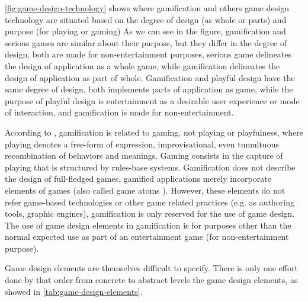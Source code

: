 \autoref{fig:game-design-technology} shows where gamification and others game design technology are situated based on the degree of design (as whole or parts) and purpose (for playing or gaming)
As we can see in the figure, gamification and serious games are similar about their purpose, but they differ in the degree of design, both are made for non-entertainment purposes, serious game delineates the design of application as a whole game, while gamification delineates the design of application as part of whole.
Gamification and playful design have the same degree of design, both implements parts of application as game, while the purpose of playful design is entertainment as a desirable user experience or mode of interaction, and gamification is made for non-entertainment.

According to , gamification is related to gaming, not playing or playfulness, where playing denotes a free-form of expression, improvisational, even tumultuous recombination of behaviors and meanings.
Gaming consists in the capture of playing that is structured by rules-base systems. Gamification does not describe the design of full-fledged games, gamified applications merely incorporate elements of games (also called game atoms \cite{BrathwaiteSchreiber2009}).
However, these elements do not refer game-based technologies or other game related practices (e.g. as authoring tools, graphic engines), gamification is only reserved for the use of game design.
The use of game design elements in gamification is for purposes other than the normal expected use as part of an entertainment game (for non-entertainment purpose).

Game design elements are themselves difficult to specify.
There is only one effort done by  that order from concrete to abstract levels the game design elements, as showed in
\autoref{tab:game-design-elements}.

